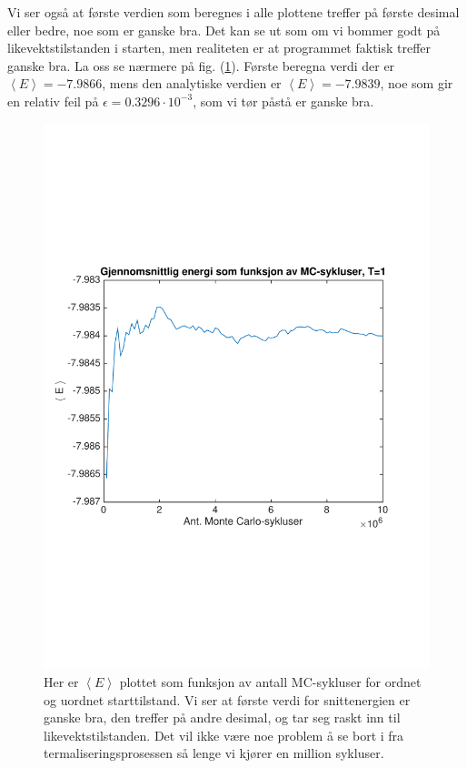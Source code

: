 \documentclass[norsk, 10pt]{article}
\def\mean#1{\left\langle #1 \right\rangle}
\begin{document}
Vi ser også at første verdien som beregnes i alle plottene treffer på første desimal eller bedre, noe som er ganske bra. Det kan se ut som om vi bommer godt på likevektstilstanden i starten, men realiteten er at programmet faktisk treffer ganske bra. La oss se nærmere på fig. (\ref{fig:meanET1}). Første beregna verdi der er $\mean E = -7.9866$, mens den analytiske verdien er $\mean E = -7.9839$, noe som gir en relativ feil på $\epsilon = 0.3296 \cdot 10^{-3}$, som vi tør påstå er ganske bra.

\begin{figure}[H]
\centering
\includegraphics[scale = 0.6, trim = 1cm 8cm 1cm 8cm]{b_avgEnergy_MC_L2_T1.pdf}
\caption{Her er $\mean E$ plottet som funksjon av antall MC-sykluser for ordnet og uordnet starttilstand. Vi ser at første verdi for snittenergien er ganske bra, den treffer på andre desimal, og tar seg raskt inn til likevektstilstanden. Det vil ikke være noe problem å se bort i fra termaliseringsprosessen så lenge vi kjører en million sykluser.}
\label{fig:meanET1}
\end{figure}
\end{document}
